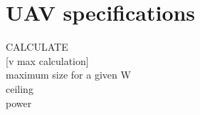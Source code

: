 \section{UAV specifications}
CALCULATE\\

[v max calculation]\\
maximum size for a given W\\
ceiling\\
power\\
